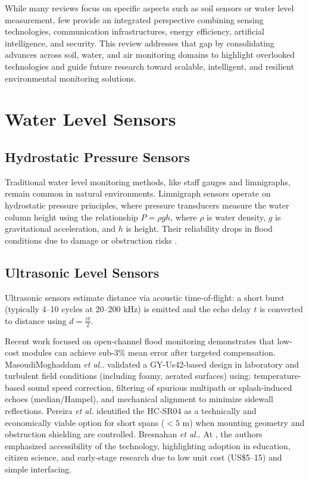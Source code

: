 \documentclass[conference]{IEEEtran}
\begin{document}

While many reviews focus on specific aspects such as soil sensors or water level measurement, few provide an integrated perspective combining sensing technologies, communication infrastructures, energy efficiency, artificial intelligence, and security. This review addresses that gap by consolidating advances across soil, water, and air monitoring domains to highlight overlooked technologies and guide future research toward scalable, intelligent, and resilient environmental monitoring solutions.

\section{Water Level Sensors} \label{cap:sensors}

\subsection{Hydrostatic Pressure Sensors}
Traditional water level monitoring methods, like staff gauges and limnigraphs, remain common in natural environments. Limnigraph sensors operate on hydrostatic pressure principles, where pressure transducers measure the water column height using the relationship $P = \rho gh$, where $\rho$ is water density, $g$ is gravitational acceleration, and $h$ is height. Their reliability drops in flood conditions due to damage or obstruction risks \cite{santana_2024_development}.

\subsection{Ultrasonic Level Sensors}
Ultrasonic sensors estimate distance via acoustic time-of-flight: a short burst (typically 4--10 cycles at 20--200 kHz) is emitted and the echo delay $t$ is converted to distance using $d = \frac{vt}{2}$.

Recent work focused on open-channel flood monitoring demonstrates that low-cost modules can achieve sub-3\% mean error after targeted compensation. MasoudiMoghaddam \textit{et al.}. \cite{mohammadrezamasoudimoghaddam_2024_a} validated a GY-Us42-based design in laboratory and turbulent field conditions (including foamy, aerated surfaces) using: temperature-based sound speed correction, filtering of spurious multipath or splash-induced echoes (median/Hampel), and mechanical alignment to minimize sidewall reflections. Pereira \textit{et al.} \cite{pereira_2022_evaluation} identified the HC-SR04 as a technically and economically viable option for short spans ($<5$ m) when mounting geometry and obstruction shielding are controlled. Bresnahan \textit{et al.}. At \cite{bresnahan_2023_a}, the authors emphasized accessibility of the technology, highlighting adoption in education, citizen science, and early-stage research due to low unit cost (US\$5--15) and simple interfacing.
\end{document}

